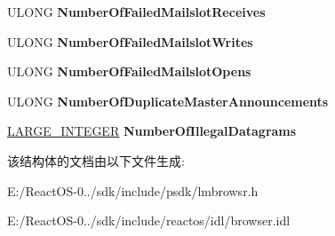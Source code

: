 \begin{DoxyCompactItemize}
U\+L\+O\+NG {\bfseries Number\+Of\+Failed\+Mailslot\+Receives}
\item 
\mbox{\label{struct___b_r_o_w_s_e_r___s_t_a_t_i_s_t_i_c_s_ac2ab044c4dba0eb08f32bec1b7c35a59}} 
U\+L\+O\+NG {\bfseries Number\+Of\+Failed\+Mailslot\+Writes}
\item 
\mbox{\label{struct___b_r_o_w_s_e_r___s_t_a_t_i_s_t_i_c_s_ae171fbfb1344b2a00a3b13476af66e26}} 
U\+L\+O\+NG {\bfseries Number\+Of\+Failed\+Mailslot\+Opens}
\item 
\mbox{\label{struct___b_r_o_w_s_e_r___s_t_a_t_i_s_t_i_c_s_a4a1bfd9df752a73ab943c198cacef44c}} 
U\+L\+O\+NG {\bfseries Number\+Of\+Duplicate\+Master\+Announcements}
\item 
\mbox{\label{struct___b_r_o_w_s_e_r___s_t_a_t_i_s_t_i_c_s_ac977cd476b9d5b93cda79a4165f5c3e5}} 
\hyperlink{union___l_a_r_g_e___i_n_t_e_g_e_r}{L\+A\+R\+G\+E\+\_\+\+I\+N\+T\+E\+G\+ER} {\bfseries Number\+Of\+Illegal\+Datagrams}
\end{DoxyCompactItemize}


该结构体的文档由以下文件生成\+:\begin{DoxyCompactItemize}
\item 
E\+:/\+React\+O\+S-\/0../sdk/include/psdk/lmbrowsr.\+h\item 
E\+:/\+React\+O\+S-\/0../sdk/include/reactos/idl/browser.\+idl\end{DoxyCompactItemize}
